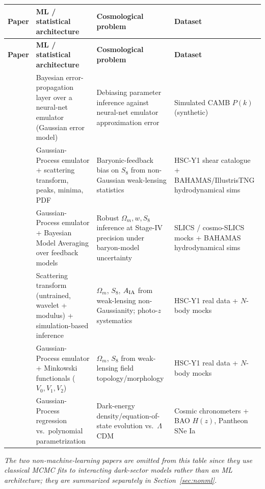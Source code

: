 \documentclass[11pt]{article}
\begin{document}
\begin{longtable}{@{}p{3.1cm}p{4.0cm}p{4.0cm}p{4.0cm}@{}}
\toprule
\textbf{Paper} & \textbf{ML / statistical architecture} & \textbf{Cosmological problem} & \textbf{Dataset} \\
\midrule
\endfirsthead
\toprule
\textbf{Paper} & \textbf{ML / statistical architecture} & \textbf{Cosmological problem} & \textbf{Dataset} \\
\midrule
\endhead
\citet{grandon2022bayesian} & Bayesian error-propagation layer over a neural-net emulator (Gaussian error model) & Debiasing parameter inference against neural-net emulator approximation error & Simulated CAMB $P(k)$ (synthetic) \\
\addlinespace
\citet{grandon2024baryonic} & Gaussian-Process emulator + scattering transform, peaks, minima, PDF & Baryonic-feedback bias on $S_8$ from non-Gaussian weak-lensing statistics & HSC-Y1 shear catalogue + BAHAMAS/IllustrisTNG hydrodynamical sims \\
\addlinespace
\citet{grandon2024bma} & Gaussian-Process emulator + Bayesian Model Averaging over feedback models & Robust $\Omega_m, w, S_8$ inference at Stage-IV precision under baryon-model uncertainty & SLICS / cosmo-SLICS mocks + BAHAMAS hydrodynamical sims \\
\addlinespace
\citet{cheng2024scattering} & Scattering transform (untrained, wavelet + modulus) + simulation-based inference & $\Omega_m$, $S_8$, $A_{\rm IA}$ from weak-lensing non-Gaussianity; photo-$z$ systematics & HSC-Y1 real data + $N$-body mocks \\
\addlinespace
\citet{armijo2025minkowski} & Gaussian-Process emulator + Minkowski functionals ($V_0,V_1,V_2$) & $\Omega_m$, $S_8$ from weak-lensing field topology/morphology & HSC-Y1 real data + $N$-body mocks \\
\addlinespace
\citet{bernardo2022parametric} & Gaussian-Process regression vs.\ polynomial parametrization & Dark-energy density/equation-of-state evolution vs.\ $\Lambda$CDM & Cosmic chronometers + BAO $H(z)$, Pantheon SNe Ia \\
\bottomrule
\end{longtable}

\noindent \textit{The two non-machine-learning papers} \citep{grandon2018evidence,cardenas2018thermodynamics} \textit{are omitted from this table since they use classical MCMC fits to interacting dark-sector models rather than an ML architecture; they are summarized separately in Section~\ref{sec:nonml}.}
\end{document}
